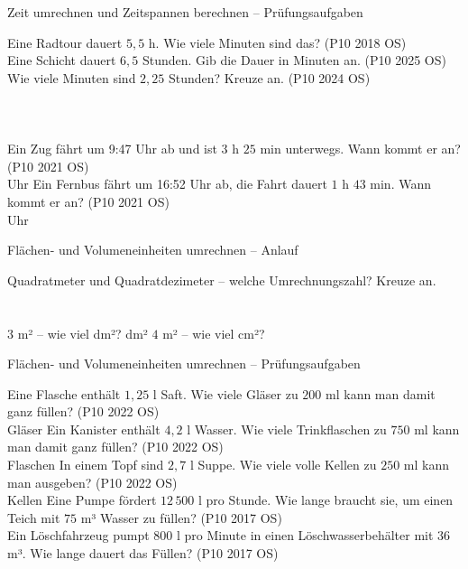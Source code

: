 \begin{aufgabe}{Zeit umrechnen und Zeitspannen berechnen – Prüfungsaufgaben}
\begin{teile}
\teil Eine Radtour dauert $5{,}5$ h. Wie viele Minuten sind das? \hfill (P10 2018 OS) \\ \leerfeld[min]
\teil Eine Schicht dauert $6{,}5$ Stunden. Gib die Dauer in Minuten an. \hfill (P10 2025 OS) \\ \leerfeld[min]
\teil Wie viele Minuten sind $2{,}25$ Stunden? Kreuze an. \hfill (P10 2024 OS)\\ \\ \\ \\ 
\teil Ein Zug fährt um 9:47 Uhr ab und ist $3$ h $25$ min unterwegs. Wann kommt er an? \hfill (P10 2021 OS) \\ \leerfeld Uhr
\teil Ein Fernbus fährt um 16:52 Uhr ab, die Fahrt dauert $1$ h $43$ min. Wann kommt er an? \hfill (P10 2021 OS) \\ \leerfeld Uhr
\end{teile}
\end{aufgabe}

\begin{aufgabe}{Flächen- und Volumeneinheiten umrechnen – Anlauf}
\begin{teile}
\teil Quadratmeter und Quadratdezimeter – welche Umrechnungszahl? Kreuze an.\\ \\ \\ 
\teil $3$ m² – wie viel dm²? \leerfeld dm²
\teil $4$ m² – wie viel cm²? \leerfeld[cm²]
\end{teile}
\end{aufgabe}

\begin{aufgabe}{Flächen- und Volumeneinheiten umrechnen – Prüfungsaufgaben}
\begin{teile}
\teil Eine Flasche enthält $1{,}25$ l Saft. Wie viele Gläser zu $200$ ml kann man damit ganz füllen? \hfill (P10 2022 OS) \\ \leerfeld Gläser
\teil Ein Kanister enthält $4{,}2$ l Wasser. Wie viele Trinkflaschen zu $750$ ml kann man damit ganz füllen? \hfill (P10 2022 OS) \\ \leerfeld Flaschen
\teil In einem Topf sind $2{,}7$ l Suppe. Wie viele volle Kellen zu $250$ ml kann man ausgeben? \hfill (P10 2022 OS) \\ \leerfeld Kellen
\teil Eine Pumpe fördert $12\,500$ l pro Stunde. Wie lange braucht sie, um einen Teich mit $75$ m³ Wasser zu füllen? \hfill (P10 2017 OS) \\ \leerfeld[h]
\teil Ein Löschfahrzeug pumpt $800$ l pro Minute in einen Löschwasserbehälter mit $36$ m³. Wie lange dauert das Füllen? \hfill (P10 2017 OS) \\ \leerfeld[min]
\end{teile}
\end{aufgabe}

